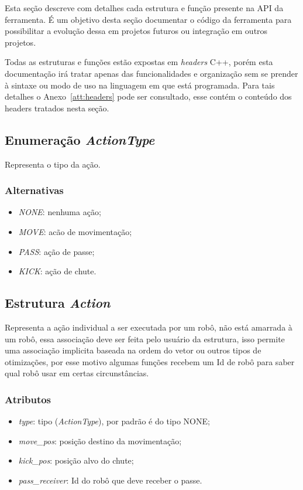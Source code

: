 Esta seção descreve com detalhes cada estrutura e função presente na API da
ferramenta.  É um objetivo desta seção documentar o código da ferramenta para
possibilitar a evolução dessa em projetos futuros ou integração em outros
projetos.

Todas as estruturas e funções estão expostas em \textit{headers} C++, porém esta
documentação irá tratar apenas das funcionalidades e organização sem  se prender
à sintaxe ou modo de uso na linguagem em que está programada.  Para tais
detalhes o Anexo~\ref{att:headers} pode ser consultado, esse contém o conteúdo
dos headers tratados nesta seção.

\subsection*{Enumeração \textit{ActionType}}

Representa o tipo da ação.

\subsubsection*{Alternativas}

\begin{itemize}
  \item \textit{NONE}: nenhuma ação;
  \item \textit{MOVE}: acão de movimentação;
  \item \textit{PASS}: ação de passe;
  \item \textit{KICK}: ação de chute.
\end{itemize}

\subsection*{Estrutura \textit{Action}}

Representa a ação individual a ser executada por um robô, não está amarrada à um
robô, essa associação deve ser feita pelo usuário da estrutura, isso permite uma
associação implicita baseada na ordem do vetor ou outros tipos de otimizações,
por esse motivo algumas funções recebem um Id de robô para saber qual robô usar
em certas circunstâncias.

\subsubsection*{Atributos}

\begin{itemize}
  \item \textit{type}: tipo (\textit{ActionType}), por padrão é do tipo NONE;
  \item \textit{move_pos}: posição destino da movimentação;
  \item \textit{kick_pos}: posição alvo do chute;
  \item \textit{pass_receiver}: Id do robô que deve receber o passe.
\end{itemize}

